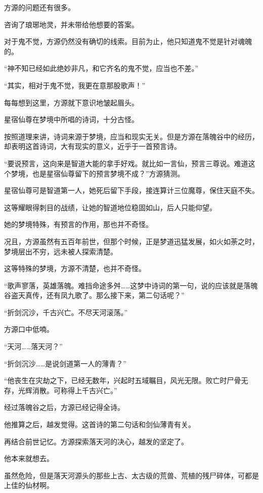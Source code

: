 
\begin{this_body}

方源的问题还有很多。

咨询了琅琊地灵，并未带给他想要的答案。

对于鬼不觉，方源仍然没有确切的线索。目前为止，他只知道鬼不觉是针对魂魄的。

“神不知已经如此绝妙非凡，和它齐名的鬼不觉，应当也不差。”

“其实，相对于鬼不觉，我更在意那股歌声！”

每每想到这里，方源就下意识地皱起眉头。

星宿仙尊在梦境中所唱的诗词，十分古怪。

按照道理来讲，诗词来源于梦境，应当和现实无关。但是方源在落魄谷中的经历，却表明这首诗词，大有现实的意义，近乎于一首预言诗。

“要说预言，这向来是智道大能的拿手好戏。就比如一言仙，预言三尊说。难道这个梦境，也是星宿仙尊留下的预言梦境不成？”方源猜测。

星宿仙尊可是智道第一人，她死后留下手段，接连算计三位魔尊，保住天庭不失。

这等耀眼得刺目的战绩，让她的智道地位稳固如山，后人只能仰望。

她的梦境特殊，有预言的作用，那也并不奇怪。

况且，方源虽然有五百年前世，但那个时候，正是梦道迅猛发展，如火如荼之时，梦境层出不穷，远未被人探索清楚。

这等特殊的梦境，方源不清楚，也并不奇怪。

“歌声寥落，英雄落魄。难挡命途多舛……这梦中诗词的第一句，说的应该就是落魄谷盗天真传，还有凤九歌了。那么接下来，第二句话呢？”

“折剑沉沙，千古兴亡。不尽天河滚荡。”

方源口中低喃。

“天河……落天河？”

“折剑沉沙……是说剑道第一人的薄青？”

“他丧生在灾劫之下，已经无数年，兴起时五域瞩目，风光无限。败亡时尸骨无存，光辉消散。可称得上千古兴亡。”

经过落魄谷之后，方源已经记得全诗。

他推算之后，越发觉得。这首诗的第二句话和剑仙薄青有关。

再结合前世记忆。方源探索落天河的决心，越发的坚定了。

他本来就想去。

虽然危险，但是落天河源头的那些上古、太古级的荒兽、荒植的残尸碎体，可都是上佳的仙材啊。


\end{this_body}
